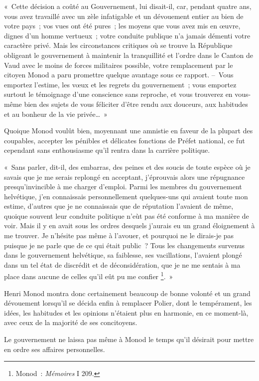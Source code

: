 \documentclass[french,twoside]{book} %
\newenvironment{quoteblock}%
  {\begin{quoting}}
  {\end{quoting}}
\newenvironment{quotebar}{%
    \def\FrameCommand{{\color{rubric!10!}\vrule width 0.5em} \hspace{0.9em}}%
    \def\OuterFrameSep{\itemsep} %
    \MakeFramed {\advance\hsize-\width \FrameRestore}
  }%
  {%
    \endMakeFramed
  }
\renewenvironment{quoteblock}%
  {%
    \savenotes
    \setstretch{0.9}
    \normalfont
    \begin{quotebar}
  }
  {%
    \end{quotebar}
    \spewnotes
  }
\begin{document}
\begin{quoteblock}
 \noindent « Cette décision a coûté au Gouvernement, lui disait-il, car, pendant quatre ans, vous avez travaillé avec un zèle infatigable et un dévouement entier au bien de votre pays ; vos vues ont été pures ; les moyens que vous avez mis en œuvre, dignes d’un homme vertueux ; votre conduite publique n’a jamais démenti votre caractère privé. Mais les circonstances critiques où se trouve la République obligeant le gouvernement à maintenir la tranquillité et l’ordre dans le Canton de Vaud avec le moins de forces militaires possible, votre remplacement par le citoyen Monod a paru promettre quelque avantage sous ce rapport. – Vous emportez l’estime, les vœux et les regrets du gouvernement ; vous emportez surtout le témoignage d’une conscience sans reproche, et vous trouverez en vous-même bien des sujets de vous féliciter d’être rendu aux douceurs, aux habitudes et au bonheur de la vie privée… »
 \end{quoteblock}

\noindent Quoique Monod voulût bien, moyennant une amnistie en faveur de la plupart des coupables, accepter les pénibles et délicates fonctions de Préfet national, ce fut cependant sans enthousiasme qu’il rentra dans la carrière politique.\par

\begin{quoteblock}
 \noindent « Sans parler, dit-il, des embarras, des peines et des soucis de toute espèce où je savais que je me serais replongé en acceptant, j’éprouvais alors une répugnance presqu’invincible à me charger d’emploi. Parmi les membres du gouvernement helvétique, j’en connaissais personnellement quelques-uns qui avaient toute mon estime, d’autres que je ne connaissais que de réputation l’avaient de même, quoique souvent leur conduite politique n’eùt pas été conforme à ma manière de voir. Mais il y en avait sous les ordres desquels j’aurais eu un grand éloignement à me trouver. Je n’hésite pas même à l’avouer, et pourquoi ne le dirais-je pas puisque je ne parle que de ce qui était public ? Tous les changements survenus dans le gouvernement helvétique, sa faiblesse, ses vacillations, l’avaient plongé dans un tel état de discrédit et de déconsidération, que je ne me sentais à ma place dans aucune de celles qu’il eût pu me confier \footnote{Monod : \emph{Mémoires} I 209.}. »
 \end{quoteblock}

\noindent Henri Monod montra donc certainement beaucoup de bonne volonté et un grand dévouement lorsqu’il se décida enfin à remplacer Polier, dont le tempérament, les idées, les habitudes et les opinions n’étaient plus en harmonie, en ce moment-là, avec ceux de la majorité de ses concitoyens.\par
Le gouvernement ne laissa pas même à Monod le temps qu’il désirait pour mettre en ordre ses affaires personnelles.\par
\end{document}
